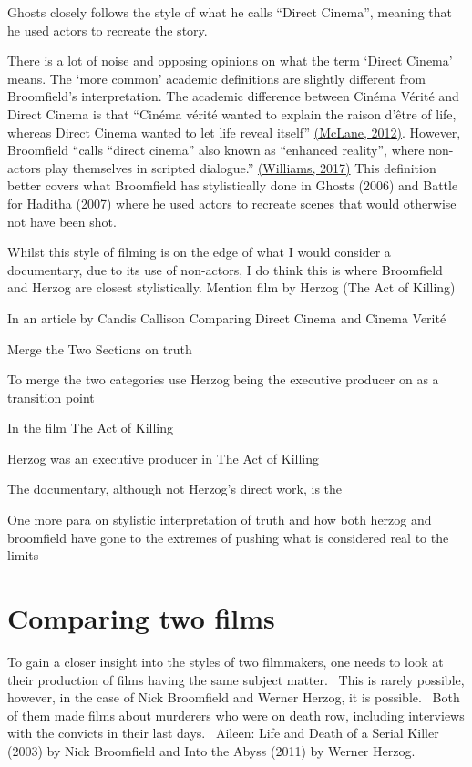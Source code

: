\documentclass[
]{book}
\begin{document}
Ghosts closely follows the style of what he calls ``Direct Cinema'', meaning that he used actors to recreate the story.

There is a lot of noise and opposing opinions on what the term `Direct Cinema' means. The `more common' academic definitions are slightly different from Broomfield's interpretation. The academic difference between Cinéma Vérité and Direct Cinema is that ``Cinéma vérité wanted to explain the raison d'être of life, whereas Direct Cinema wanted to let life reveal itself'' \href{https://paperpile.com/c/SdLVV0/ojqC}{(McLane, 2012)}. However, Broomfield ``calls ``direct cinema'' also known as ``enhanced reality'', where non-actors play themselves in scripted dialogue.'' \href{https://paperpile.com/c/SdLVV0/PkHs}{(Williams, 2017)} This definition better covers what Broomfield has stylistically done in Ghosts (2006) and Battle for Haditha (2007) where he used actors to recreate scenes that would otherwise not have been shot.

Whilst this style of filming is on the edge of what I would consider a documentary, due to its use of non-actors, I do think this is where Broomfield and Herzog are closest stylistically. Mention film by Herzog (The Act of Killing)

In an article by Candis Callison Comparing Direct Cinema and Cinema Verité

Merge the Two Sections on truth~

To merge the two categories use Herzog being the executive producer on as a transition point

In the film The Act of Killing

Herzog was an executive producer in The Act of Killing

The documentary, although not Herzog's direct work, is the~

One more para on stylistic interpretation of truth and how both herzog and broomfield have gone to the extremes of pushing what is considered real to the limits~

\hypertarget{comparing-two-films}{%
\section{Comparing two films}\label{comparing-two-films}}

To gain a closer insight into the styles of two filmmakers, one needs to look at their production of films having the same subject matter.~ This is rarely possible, however, in the case of Nick Broomfield and Werner Herzog, it is possible.~ Both of them made films about murderers who were on death row, including interviews with the convicts in their last days.~ Aileen: Life and Death of a Serial Killer (2003) by Nick Broomfield and Into the Abyss (2011) by Werner Herzog.
\end{document}
